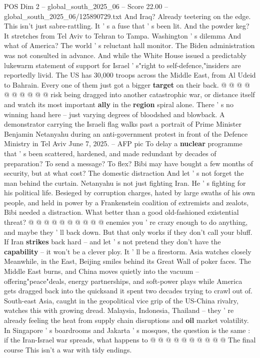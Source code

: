 \begin{textsample}{POS Dim 2 – global\_south\_2025\_06 – Score 22.00 – global\_south\_2025\_06/125890729.txt}
And Iraq?
Already teetering on the edge.
This isn't just sabre-rattling.
It ' s a fuse that ' s been lit.
And the powder keg?
It stretches from Tel Aviv to Tehran to Tampa.
Washington ' s dilemma And what of America?
The world ' s reluctant hall monitor.
The Biden administration was not consulted in advance.
And while the White House issued a predictably lukewarm statement of support for Israel ' s"right to self-defence,"insiders are reportedly livid.
The US has 30,000 troops across the Middle East, from Al Udeid to Bahrain.
Every one of them just got a bigger \textbf{target} on their back. @ @ @ @ @ @ @ @ @ @ risk being dragged into another catastrophic war, or distance itself and watch its most important \textbf{ally} in the \textbf{region} spiral alone.
There ' s no winning hand here -- just varying degrees of bloodshed and blowback.
A demonstrator carrying the Israeli flag walks past a portrait of Prime Minister Benjamin Netanyahu during an anti-government protest in front of the Defence Ministry in Tel Aviv June 7, 2025. -- AFP pic To delay a \textbf{nuclear} programme that ' s been scattered, hardened, and made redundant by decades of preparation?
To send a message?
To flex?
Bibi may have bought a few months of security, but at what cost?
The domestic distraction And let ' s not forget the man behind the curtain.
Netanyahu is not just fighting Iran.
He ' s fighting for his political life.
Besieged by corruption charges, hated by large swaths of his own people, and held in power by a Frankenstein coalition of extremists and zealots, Bibi needed a distraction.
What better than a good old-fashioned existential threat? @ @ @ @ @ @ @ @ @ @ enemies you ' re crazy enough to do anything, and maybe they ' ll back down.
But that only works if they don't call your bluff.
If Iran \textbf{strikes} back hard -- and let ' s not pretend they don't have the \textbf{capability} -- it won't be a clever ploy.
It ' ll be a firestorm.
Asia watches closely Meanwhile, in the East, Beijing smiles behind its Great Wall of poker faces.
The Middle East burns, and China moves quietly into the vacuum -- offering"peace"deals, energy partnerships, and soft-power plays while America gets dragged back into the quicksand it spent two decades trying to crawl out of.
South-east Asia, caught in the geopolitical vice grip of the US-China rivalry, watches this with growing dread.
Malaysia, Indonesia, Thailand -- they ' re already feeling the heat from supply chain disruptions and \textbf{oil} market volatility.
In Singapore ' s boardrooms and Jakarta ' s mosques, the question is the same : if the Iran-Israel war spreads, what happens to @ @ @ @ @ @ @ @ @ @ The final course This isn't a war with tidy endings.

\end{textsample}
